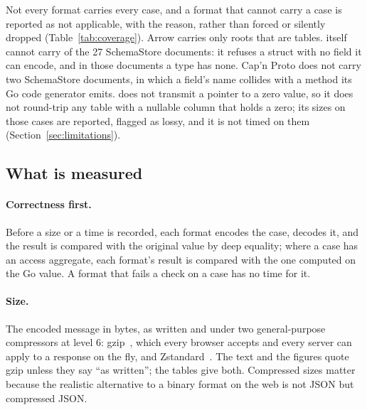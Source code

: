 \begin{table}[t]
\centering\small
{}
\caption{Formats, implementations and versions. The versions are those pinned
by the artifact's ; \colbin{}'s is the one the run recorded.}
\label{tab:baselines}
\end{table}

Not every format carries every case, and a format that cannot carry a case is
reported as not applicable, with the reason, rather than forced or silently
dropped (Table~\ref{tab:coverage}). Arrow carries only roots that are tables.
\colbin{} itself cannot carry
 of the 27 SchemaStore documents: it
refuses a struct with no field it can encode, and in those documents a type
has none. Cap'n Proto does not carry two SchemaStore documents, in which a
field's name collides with a method its Go code generator emits.  does not transmit a pointer to a zero value, so it does
not round-trip any table with a nullable column that holds a zero; its sizes
on those cases are reported, flagged as lossy, and it is not timed on them
(Section~\ref{sec:limitations}).

\begin{table}[t]
\centering\small
{}
\caption{Cases per format and regime: round-tripped exactly, encoded but not
round-tripped (lossy; sized, not timed), and not applicable.}
\label{tab:coverage}
\end{table}

\subsection{What is measured}

\paragraph{Correctness first.} Before a size or a time is recorded, each
format encodes the case, decodes it, and the result is compared with the
original value by deep equality; where a case has an access aggregate, each
format's result is compared with the one computed on the Go value. A format
that fails a check on a case has no time for it.

\paragraph{Size.} The encoded message in bytes, as written and under two
general-purpose compressors at level 6: gzip~\cite{rfc1952}, which every
browser accepts and every server can apply to a response on the fly, and
Zstandard~\cite{rfc8878}. The text and the figures quote gzip unless they
say ``as written''; the tables give both. Compressed sizes matter
because the realistic alternative to a binary format on the web is not JSON
but compressed JSON.

